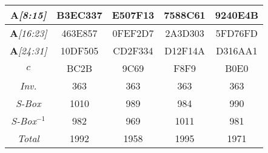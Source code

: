 \begin{sidewaystable}
\begin{center}
\begin{tabular}{|c||c|c|c|c|}
\emph{$\mathbf{A}$[8:15]} & B3EC337 &  E507F13 &  7588C61 &  9240E4B  \\ \hline
\emph{$\mathbf{A}$[16:23]} & 463E857 &  0FEF2D7 &  2A3D303 &  5FD76FD \\ \hline
\emph{$\mathbf{A}$[24:31]} & 10DF505 &  CD2F334 &  D12F14A &  D316AA1  \\ \hline
\emph{$c$} &   BC2B &  9C69 &  F8F9 &  B0E0  \\ \hline
\emph{Inv.} & 363 &  363 &  363 &  363  \\ \hline
\emph{S-Box} & 1010 &  989 &  984 &  990 \\ \hline 
\emph{S-Box$^{-1}$} & 982 &  969 &  1011 &  981  \\ \hline
\emph{Total} & 1992 &  1958 &  1995 &  1971  \\ \hline
    \end{tabular}
\end{center}
\end{sidewaystable}



